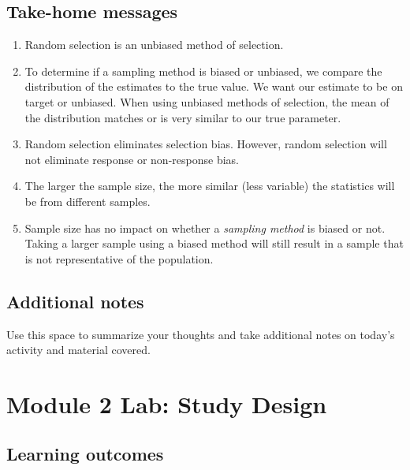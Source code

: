 \documentclass[
]{report}
\begin{document}
\hypertarget{take-home-messages-2}{%
\subsection{Take-home messages}\label{take-home-messages-2}}

\begin{enumerate}
\def\labelenumi{\arabic{enumi}.}
\item
  Random selection is an unbiased method of selection.
\item
  To determine if a sampling method is biased or unbiased, we compare the distribution of the estimates to the true value. We want our estimate to be on target or unbiased. When using unbiased methods of selection, the mean of the distribution matches or is very similar to our true parameter.
\item
  Random selection eliminates selection bias. However, random selection will not eliminate response or non-response bias.
\item
  The larger the sample size, the more similar (less variable) the statistics will be from different samples.
\item
  Sample size has no impact on whether a \emph{sampling method} is biased or not. Taking a larger sample using a biased method will still result in a sample that is not representative of the population.
\end{enumerate}

\hypertarget{additional-notes-2}{%
\subsection{Additional notes}\label{additional-notes-2}}

Use this space to summarize your thoughts and take additional notes on today's activity and material covered.

\newpage

\hypertarget{module-2-lab-study-design}{%
\section{Module 2 Lab: Study Design}\label{module-2-lab-study-design}}


\hypertarget{learning-outcomes-3}{%
\subsection{Learning outcomes}\label{learning-outcomes-3}}
\end{document}
